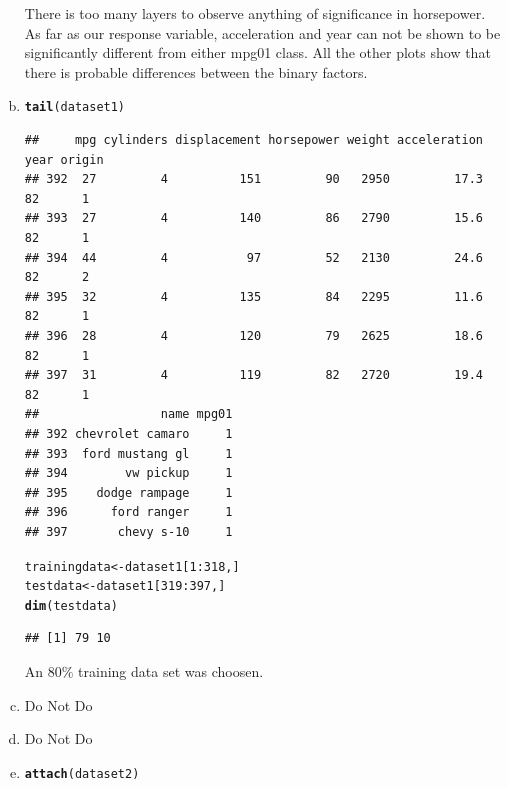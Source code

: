 \documentclass{article}\usepackage[]{graphicx}\usepackage[]{color}
\makeatletter
\newcommand{\hlnum}[1]{\textcolor[rgb]{0.686,0.059,0.569}{#1}}%
\newcommand{\hlopt}[1]{\textcolor[rgb]{0,0,0}{#1}}%
\newcommand{\hlstd}[1]{\textcolor[rgb]{0.345,0.345,0.345}{#1}}%
\newcommand{\hlkwb}[1]{\textcolor[rgb]{0.69,0.353,0.396}{#1}}%
\newcommand{\hlkwd}[1]{\textcolor[rgb]{0.737,0.353,0.396}{\textbf{#1}}}%
\newenvironment{kframe}{%
 \def\at@end@of@kframe{}%
 \ifinner\ifhmode%
  \def\at@end@of@kframe{\end{minipage}}%
  \begin{minipage}{\columnwidth}%
 \fi\fi%
 \def\FrameCommand##1{\hskip\@totalleftmargin \hskip-\fboxsep
 \colorbox{shadecolor}{##1}\hskip-\fboxsep
     \hskip-\linewidth \hskip-\@totalleftmargin \hskip\columnwidth}%
 \MakeFramed {\advance\hsize-\width
   \@totalleftmargin\z@ \linewidth\hsize
   \@setminipage}}%
 {\par\unskip\endMakeFramed%
 \at@end@of@kframe}
\newenvironment{knitrout}{}{} %
\makeatother
\begin{document}
\begin{enumerate}[(a)]
There is too many layers to observe anything of significance in horsepower. As far as our response variable, acceleration and year can not be shown to be significantly different from either mpg01 class. All the other plots show that there is probable differences between the binary factors.
\item
\begin{knitrout}
\color{fgcolor}\begin{kframe}
\begin{alltt}
\hlkwd{tail}\hlstd{(dataset1)}
\end{alltt}
\begin{verbatim}
##     mpg cylinders displacement horsepower weight acceleration year origin
## 392  27         4          151         90   2950         17.3   82      1
## 393  27         4          140         86   2790         15.6   82      1
## 394  44         4           97         52   2130         24.6   82      2
## 395  32         4          135         84   2295         11.6   82      1
## 396  28         4          120         79   2625         18.6   82      1
## 397  31         4          119         82   2720         19.4   82      1
##                 name mpg01
## 392 chevrolet camaro     1
## 393  ford mustang gl     1
## 394        vw pickup     1
## 395    dodge rampage     1
## 396      ford ranger     1
## 397       chevy s-10     1
\end{verbatim}
\begin{alltt}
\hlstd{trainingdata}\hlkwb{<-}\hlstd{dataset1[}\hlnum{1}\hlopt{:}\hlnum{318}\hlstd{,]}
\hlstd{testdata}\hlkwb{<-}\hlstd{dataset1[}\hlnum{319}\hlopt{:}\hlnum{397}\hlstd{,]}
\hlkwd{dim}\hlstd{(testdata)}
\end{alltt}
\begin{verbatim}
## [1] 79 10
\end{verbatim}
\end{kframe}
\end{knitrout}
An $80\%$ training data set was choosen.

\item
Do Not Do
\item
Do Not Do
\item

\begin{knitrout}
\color{fgcolor}\begin{kframe}
\begin{alltt}
\hlkwd{attach}\hlstd{(dataset2)}
\end{alltt}



\end{kframe}
\end{knitrout}
\end{enumerate}
\end{document}
